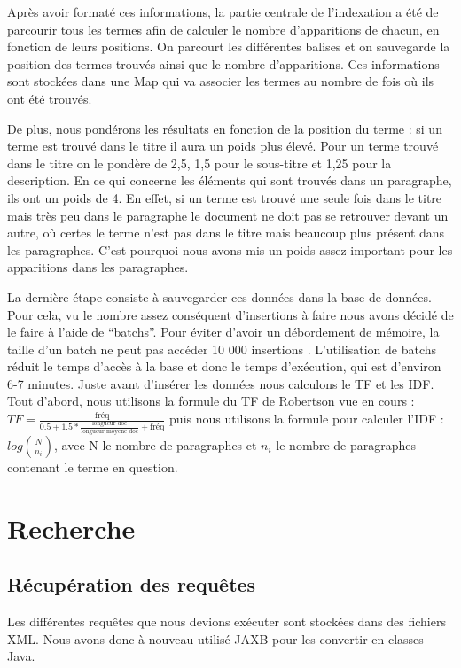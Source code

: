 \documentclass{article}
\begin{document}
Après avoir formaté ces informations, la partie centrale de l’indexation a été de
parcourir tous les termes afin de calculer le nombre d’apparitions de chacun, en
fonction de leurs positions. On parcourt les différentes balises et on sauvegarde la
position des termes trouvés ainsi que le nombre d’apparitions. Ces informations sont
stockées dans une Map qui va associer les termes au nombre de fois où ils ont été
trouvés.


De plus, nous pondérons les résultats en fonction de la position du terme : si un
terme est trouvé dans le titre il aura un poids plus élevé. Pour un terme trouvé dans
le titre on le pondère de 2,5, 1,5 pour le sous-titre et 1,25 pour la description. En
ce qui concerne les éléments qui sont trouvés dans un paragraphe, ils ont un poids de 4.
En effet, si un terme est trouvé une seule fois dans le titre mais très peu dans le
paragraphe le document ne doit pas se retrouver devant un autre, où certes le terme
n’est pas dans le titre mais beaucoup plus présent dans les paragraphes. C’est
pourquoi nous avons mis un poids assez important pour les apparitions dans les
paragraphes. 

La dernière étape consiste à sauvegarder ces données dans la base de données. Pour
cela, vu le nombre assez conséquent d’insertions à faire nous avons décidé de le
faire à l’aide de “batchs”. Pour éviter d’avoir un débordement de mémoire, la taille
d’un batch ne peut pas accéder 10 000 insertions . L’utilisation de batchs réduit le
temps d’accès à la base et donc le temps d’exécution, qui est d’environ 6-7 minutes.
Juste avant d’insérer les données nous calculons le TF et les IDF. Tout d’abord, nous
utilisons la formule du TF de Robertson vue en cours
: $TF= \frac{\text{fréq}}{0.5 + 1.5 * \frac{\text{longueur doc}}{\text{longueur moyene doc}} + \text{fréq}}$
puis nous utilisons la formule pour calculer l’IDF : $log(\frac{N}{n_i})$, avec N le
nombre de paragraphes et $n_i$ le nombre de paragraphes contenant le terme en question.


\section{Recherche}

\subsection{Récupération des requêtes}

Les différentes requêtes que nous devions exécuter sont stockées dans des fichiers
XML. Nous avons donc à nouveau utilisé JAXB pour les convertir en classes Java. 
\end{document}
